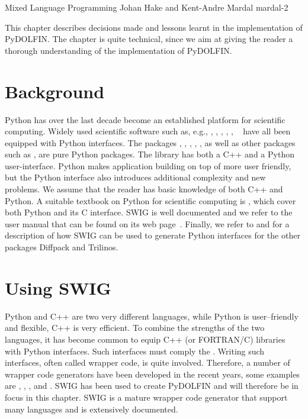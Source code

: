               {Mixed Language Programming}
              {Johan Hake and Kent-Andre Mardal}
              {mardal-2}


This chapter describes decisions made and lessons learnt
in the implementation of PyDOLFIN. The chapter is quite technical, since
we aim at giving the reader a thorough understanding of the implementation
of PyDOLFIN. 

\section{Background}
Python has over the last decade become an established platform
for scientific computing. Widely used scientific software such as, e.g.,
\citet{www:petsc}, \citet{www:hypre},
\citet{www:trilinos}, \cite{www:vtk}, \cite{www:vmtk},
\ginac~\citep{BauerFrinkKreckel2000} have all been equipped with Python
interfaces. The \fenics
packages \ferari, \fiat , \ffc,
\ufl, \viper, as well as  other packages such as 
\sympy\citep{CertikSeoanePetersonEtAl2009},
\scipy\citep{JonesOliphantPetersonEtAl2009} are pure Python packages.
The \dolfin library has both a C++ and a Python user-interface. Python
makes application building on top of \dolfin more user friendly, but
the Python interface also introduces additional complexity and new
problems.  We assume that the reader has basic knowledge of both C++
and Python. A suitable textbook on Python for scientific computing is
\cite{Langtangen2008}, which cover both Python and its C interface.
SWIG is well documented and we refer to the user manual that can be
found on its web page~\cite{www:swig}. Finally, we refer to
\citet{Langtangen2003b} and \citet{SalaSpotzHeroux2008} for a
description of how SWIG can be used to generate Python interfaces for
the other packages Diffpack and Trilinos.


\section{Using SWIG}

Python and C++ are two very different languages, while Python is
user--friendly and flexible, C++ is very efficient. 
To combine the strengths of the two languages, it has become common
to equip C++ (or FORTRAN/C) libraries with Python interfaces. 
Such interfaces must comply the \citet{www:python-capi}.   
Writing such interfaces, often called wrapper code, is quite involved.
Therefore, a number of wrapper code generators have been developed in the
recent years, some examples are   
 \citet{Peterson}, \citet{SIP}, \citet{Siloon}, and \citet{www:swig}. 
 SWIG has been used to create PyDOLFIN and will therefore be in focus in
 this chapter. SWIG is a mature wrapper code generator that support many languages and is extensively documented.

